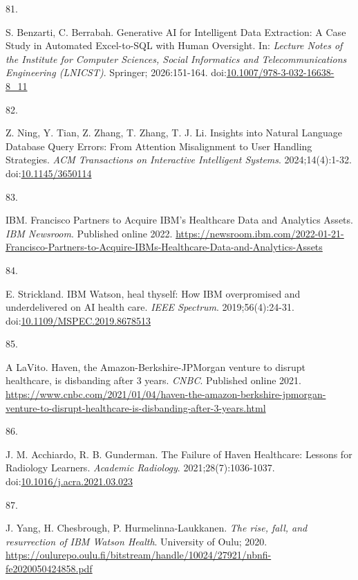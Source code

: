\documentclass[
  american,
  11pt,
  letterpaper,
  oneside  ,captions=tableheading
]{scrartcl}
\newlength{\cslhangindent}
\newlength{\csllabelwidth}
\newenvironment{CSLReferences}[2] %
 {\begin{list}{}{%
  \setlength{\itemindent}{0pt}
  \setlength{\leftmargin}{0pt}
  \setlength{\parsep}{0pt}
  \ifodd #1
   \setlength{\leftmargin}{\cslhangindent}
   \setlength{\itemindent}{-1\cslhangindent}
  \fi
  \setlength{\itemsep}{#2\baselineskip}}}
 {\end{list}}
\newcommand{\CSLLeftMargin}[1]{\parbox[t]{\csllabelwidth}{\strut#1\strut}}
\newcommand{\CSLRightInline}[1]{\parbox[t]{\linewidth - \csllabelwidth}{\strut#1\strut}}
\begin{document}
\begin{CSLReferences}{0}{1}
\CSLLeftMargin{81. }%
\CSLRightInline{S. Benzarti, C. Berrabah. {Generative AI for Intelligent
Data Extraction: A Case Study in Automated Excel-to-SQL with Human
Oversight}. In: \emph{Lecture Notes of the Institute for Computer
Sciences, Social Informatics and Telecommunications Engineering
(LNICST)}. Springer; 2026:151-164.
doi:\href{https://doi.org/10.1007/978-3-032-16638-8_11}{10.1007/978-3-032-16638-8\_11}}

\CSLLeftMargin{82. }%
\CSLRightInline{Z. Ning, Y. Tian, Z. Zhang, T. Zhang, T. J. Li.
{Insights into Natural Language Database Query Errors: From Attention
Misalignment to User Handling Strategies}. \emph{ACM Transactions on
Interactive Intelligent Systems}. 2024;14(4):1-32.
doi:\href{https://doi.org/10.1145/3650114}{10.1145/3650114}}

\CSLLeftMargin{83. }%
\CSLRightInline{IBM. {Francisco Partners to Acquire IBM's Healthcare
Data and Analytics Assets}. \emph{{IBM} Newsroom}. Published online
2022.
\url{https://newsroom.ibm.com/2022-01-21-Francisco-Partners-to-Acquire-IBMs-Healthcare-Data-and-Analytics-Assets}}

\CSLLeftMargin{84. }%
\CSLRightInline{E. Strickland. {IBM Watson, heal thyself: How IBM
overpromised and underdelivered on AI health care}. \emph{IEEE
Spectrum}. 2019;56(4):24-31.
doi:\href{https://doi.org/10.1109/MSPEC.2019.8678513}{10.1109/MSPEC.2019.8678513}}

\CSLLeftMargin{85. }%
\CSLRightInline{A LaVito. {Haven, the Amazon-Berkshire-JPMorgan venture
to disrupt healthcare, is disbanding after 3 years}. \emph{{CNBC}}.
Published online 2021.
\url{https://www.cnbc.com/2021/01/04/haven-the-amazon-berkshire-jpmorgan-venture-to-disrupt-healthcare-is-disbanding-after-3-years.html}}

\CSLLeftMargin{86. }%
\CSLRightInline{J. M. Acchiardo, R. B. Gunderman. {The Failure of Haven
Healthcare: Lessons for Radiology Learners}. \emph{Academic Radiology}.
2021;28(7):1036-1037.
doi:\href{https://doi.org/10.1016/j.acra.2021.03.023}{10.1016/j.acra.2021.03.023}}

\CSLLeftMargin{87. }%
\CSLRightInline{J. Yang, H. Chesbrough, P. Hurmelinna-Laukkanen.
\emph{{The rise, fall, and resurrection of IBM Watson Health}}.
University of Oulu; 2020.
\url{https://oulurepo.oulu.fi/bitstream/handle/10024/27921/nbnfi-fe2020050424858.pdf}}

\end{CSLReferences}
\end{document}
